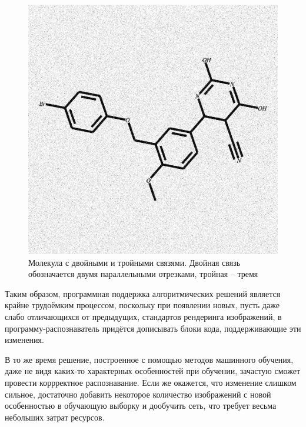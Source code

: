 \begin{figure}[ht!] 
	\center
	\includegraphics [scale=0.45] {my_folder/images/23bonds}
	\caption{Молекула с двойными и тройными связями. Двойная связь обозначается двумя параллельными отрезками, тройная -- тремя} 
	\label{fig:23bond} 
\end{figure}

Таким образом, программная поддержка алгоритмических решений является крайне трудоёмким процессом, поскольку при появлении новых, пусть даже слабо отличающихся от предыдущих, стандартов рендеринга изображений, в программу-распознаватель придётся дописывать блоки кода, поддерживающие эти изменения.

В то же время решение, построенное с помощью методов машинного обучения, даже не видя каких-то характерных особенностей при обучении, зачастую сможет провести коррректное распознавание. Если же окажется, что изменение слишком сильное, достаточно добавить некоторое количество изображений с новой особенностью в обучающую выборку и дообучить сеть, что требует весьма небольших затрат ресурсов.

